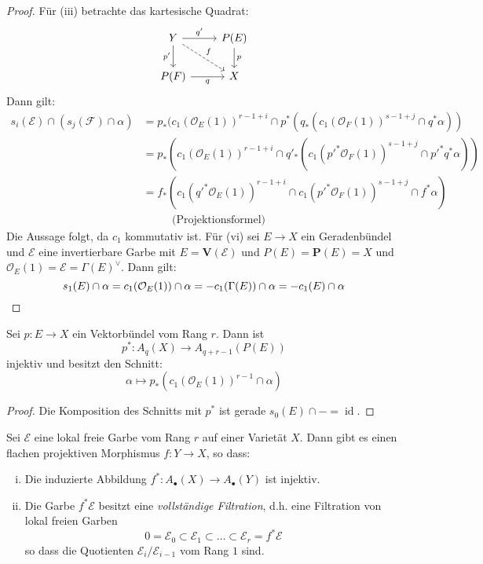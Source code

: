 \documentclass[10pt,a4paper]{article}
\begin{document}
\begin{proof}
Für (iii) betrachte das kartesische Quadrat:
\[ \begin{tikzcd}
Y \rar["q'"]\dar["p'"']\ar[rd, "f", dashed] & P(E) \dar["p"]\\
P(F)\rar["q"'] & X
\end{tikzcd} \]
Dann gilt:
\begin{align*}
s_i(\mathcal{E})\cap (s_j(\mathcal{F})\cap \alpha) &= p_\ast (c_1(\mathcal{O}_E(1))^{r-1+i} \cap p^\ast(q_\ast(c_1(\mathcal{O}_F(1))^{s-1+j}\cap q^\ast \alpha))\\
&= p_\ast(c_1(\mathcal{O}_E(1))^{r-1+i}\cap q'_\ast(c_1(p'^\ast\mathcal{O}_F (1))^{s-1+j}\cap p'^\ast q^\ast\alpha))\\
&= f_\ast(c_1(q'^\ast\mathcal{O}_E(1))^{r-1+i}\cap c_1(p'^\ast\mathcal{O}_F (1))^{s-1+j}\cap f^\ast\alpha)\\
&\phantom{==} \text{(Projektionsformel)}
\end{align*}
Die Aussage folgt, da $c_1$ kommutativ ist. Für (vi) sei $E\to X$ ein Geradenbündel und $\mathcal{E}$ eine invertierbare Garbe mit $E=\mathbf{V}(\mathcal{E})$ und $P(E)=\mathbf{P}(E)=X$ und $\mathcal{O}_E(1)=\mathcal{E} = \Gamma(E)^\vee$. Dann gilt:
\[ s_1(E)\cap \alpha = c_1(\mathcal{O}_E(1))\cap\alpha = -c_1(\Gamma(E))\cap\alpha = -c_1(E)\cap\alpha\qedhere \]
\end{proof}

\begin{corollary}
Sei $p:E\to X$ ein Vektorbündel vom Rang $r$. Dann ist
\[ p^\ast: A_q(X)\to A_{q+r-1}(P(E)) \]
injektiv und besitzt den Schnitt:
\[ \alpha\mapsto p_\ast(c_1(\mathcal{O}_E(1))^{r-1}\cap\alpha) \]
\end{corollary}

\begin{proof}
Die Komposition des Schnitts mit $p^\ast$ ist gerade $s_0(E)\cap - = \operatorname{id}$.
\end{proof}

\begin{corollary}
Sei $\mathcal{E}$ eine lokal freie Garbe vom Rang $r$ auf einer Varietät $X$. Dann gibt es einen flachen projektiven Morphismus $f:Y\to X$, so dass:
\begin{enumerate}[(i)]
\item Die induzierte Abbildung $f^\ast:A_\bullet(X)\to A_\bullet(Y)$ ist injektiv.
\item Die Garbe $f^\ast\mathcal{E}$ besitzt eine \textit{vollständige Filtration}, d.h. eine Filtration von lokal freien Garben
\[ 0 = \mathcal{E}_0 \subset \mathcal{E}_1 \subset\ldots\subset \mathcal{E}_r = f^\ast\mathcal{E} \]
so dass die Quotienten $\mathcal{E}_i/\mathcal{E}_{i-1}$ vom Rang $1$ sind.
\end{enumerate}
\end{corollary}
\end{document}
